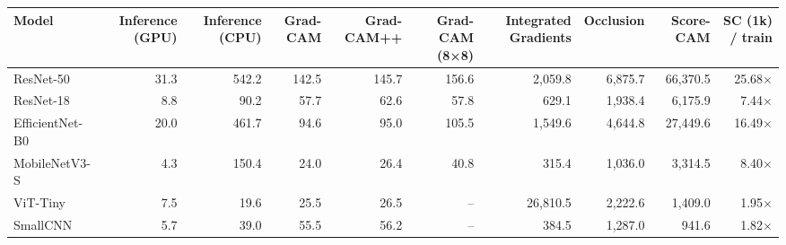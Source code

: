 \begin{tabular}{lrrrrrrrrr}
\hline
Model & Inference (GPU) & Inference (CPU) & Grad-CAM & Grad-CAM++ & Grad-CAM (8×8) & Integrated Gradients & Occlusion & Score-CAM & SC (1k) / train \\
\hline
ResNet-50 & 31.3 & 542.2 & 142.5 & 145.7 & 156.6 & 2{,}059.8 & 6{,}875.7 & 66{,}370.5 & 25.68$\times$ \\
ResNet-18 & 8.8 & 90.2 & 57.7 & 62.6 & 57.8 & 629.1 & 1{,}938.4 & 6{,}175.9 & 7.44$\times$ \\
EfficientNet-B0 & 20.0 & 461.7 & 94.6 & 95.0 & 105.5 & 1{,}549.6 & 4{,}644.8 & 27{,}449.6 & 16.49$\times$ \\
MobileNetV3-S & 4.3 & 150.4 & 24.0 & 26.4 & 40.8 & 315.4 & 1{,}036.0 & 3{,}314.5 & 8.40$\times$ \\
ViT-Tiny & 7.5 & 19.6 & 25.5 & 26.5 & -- & 26{,}810.5 & 2{,}222.6 & 1{,}409.0 & 1.95$\times$ \\
SmallCNN & 5.7 & 39.0 & 55.5 & 56.2 & -- & 384.5 & 1{,}287.0 & 941.6 & 1.82$\times$ \\
\hline
\end{tabular}